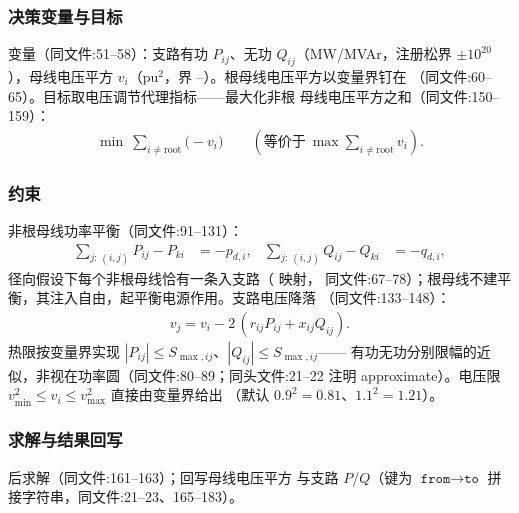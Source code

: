 \subsubsection*{决策变量与目标}
变量（同文件:51--58）：支路有功 $P_{ij}$、无功 $Q_{ij}$（MW/MVAr，注册松界
$\pm 10^{20}$），母线电压平方 $v_i$（pu$^{2}$，界
--）。根母线电压平方以变量界钉在
（同文件:60--65）。目标取电压调节代理指标——最大化非根
母线电压平方之和（同文件:150--159）：
\begin{align*}
\min\ \sum_{i\ne \mathrm{root}} \big(-v_i\big)
\qquad(\text{等价于}\ \max\textstyle\sum_{i\ne\mathrm{root}} v_i).
\end{align*}

\subsubsection*{约束}
非根母线功率平衡（同文件:91--131）：
\begin{align*}
\sum_{j:\,(i,j)} P_{ij} - P_{ki} &= -p_{d,i}, &
\sum_{j:\,(i,j)} Q_{ij} - Q_{ki} &= -q_{d,i},
\end{align*}
径向假设下每个非根母线恰有一条入支路（ 映射，
同文件:67--78）；根母线不建平衡，其注入自由，起平衡电源作用。支路电压降落
（同文件:133--148）：
\begin{align*}
v_j = v_i - 2\,(r_{ij}P_{ij} + x_{ij}Q_{ij}).
\end{align*}
热限按变量界实现 $|P_{ij}|\le S_{\max,ij}$、$|Q_{ij}|\le S_{\max,ij}$——
有功无功分别限幅的近似，非视在功率圆（同文件:80--89；同头文件:21--22 注明
approximate）。电压限 $v_{\min}^{2}\le v_i\le v_{\max}^{2}$ 直接由变量界给出
（默认 $0.9^{2}=0.81$、$1.1^{2}=1.21$）。

\subsubsection*{求解与结果回写}
 后求解（同文件:161--163）；回写母线电压平方
 与支路 $P$/$Q$（键为
$\texttt{from}\rightarrow\texttt{to}$ 拼接字符串，同文件:21--23、165--183）。

